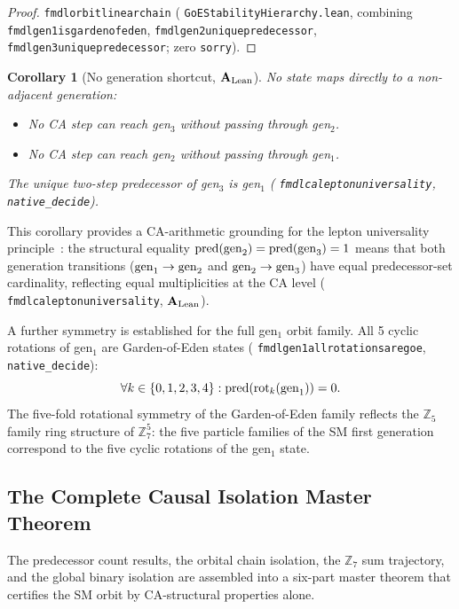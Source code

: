 \documentclass[11pt]{article}
\newtheorem{corollary}[theorem]{Corollary}
\theoremstyle{remark}
\newcommand{\lean}[1]{%
  \penalty-100
  \begingroup\def\_{\textunderscore\allowbreak}\texttt{#1}\endgroup}
\newcommand{\CatAL}{\ensuremath{\textbf{A}_{\rm Lean}}}
\begin{document}
\begin{proof}
\lean{fmdl\_orbit\_linear\_chain}
(\lean{GoEStabilityHierarchy.lean}, combining
\lean{fmdl\_gen1\_is\_garden\_of\_eden},
\lean{fmdl\_gen2\_unique\_predecessor},
\lean{fmdl\_gen3\_unique\_predecessor};
zero \texttt{sorry}).
\end{proof}

\begin{corollary}[No generation shortcut, $\CatAL$]\label{cor:no_shortcut}
No state maps directly to a non-adjacent generation:
\begin{itemize}[nosep]
\item No CA step can reach gen$_3$ without passing through gen$_2$.
\item No CA step can reach gen$_2$ without passing through gen$_1$.
\end{itemize}
The unique two-step predecessor of gen$_3$ is gen$_1$
(\lean{fmdl\_ca\_lepton\_universality}, \texttt{native\_decide}).
\end{corollary}

This corollary provides a CA-arithmetic grounding for the lepton universality
principle~\cite{PDG2022}: the structural equality $\mathrm{pred}({\rm gen}_2) = \mathrm{pred}({\rm gen}_3) = 1$
means that both generation transitions (${\rm gen}_1 \to {\rm gen}_2$ and
${\rm gen}_2 \to {\rm gen}_3$) have equal predecessor-set cardinality, reflecting equal
multiplicities at the CA level (\lean{fmdl\_ca\_lepton\_universality}, $\CatAL$).

A further symmetry is established for the full gen$_1$ orbit family.
All 5 cyclic rotations of gen$_1$ are Garden-of-Eden states
(\lean{fmdl\_gen1\_all\_rotations\_are\_goe}, \texttt{native\_decide}):
\[
\forall k \in \{0,1,2,3,4\}: \mathrm{pred}(\mathrm{rot}_k({\rm gen}_1)) = 0.
\]
The five-fold rotational symmetry of the Garden-of-Eden family reflects the
$\mathbb{Z}_5$ family ring structure of $\mathbb{Z}_7^5$: the five particle families
of the SM first generation correspond to the five cyclic rotations of the gen$_1$ state.

\subsection{The Complete Causal Isolation Master Theorem}
\label{sec:isolation_master}

The predecessor count results, the orbital chain isolation, the $\mathbb{Z}_7$ sum trajectory,
and the global binary isolation are assembled into a six-part master theorem that certifies the
SM orbit by CA-structural properties alone.
\end{document}
